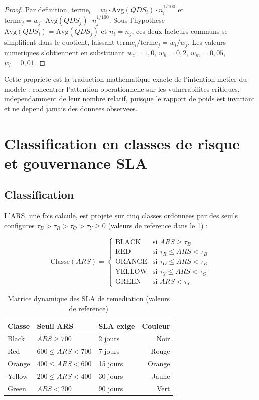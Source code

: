 \begin{proof}
Par definition, $\text{terme}_i = w_i\cdot\mathrm{Avg}(QDS_i)\cdot n_i^{1/100}$ et
$\text{terme}_j = w_j\cdot\mathrm{Avg}(QDS_j)\cdot n_j^{1/100}$. Sous l'hypothese
$\mathrm{Avg}(QDS_i)=\mathrm{Avg}(QDS_j)$ et $n_i=n_j$, ces deux facteurs communs se
simplifient dans le quotient, laissant $\text{terme}_i/\text{terme}_j = w_i/w_j$. Les
valeurs numeriques s'obtiennent en substituant $w_c=1{,}0$, $w_h=0{,}2$,
$w_m=0{,}05$, $w_l=0{,}01$.
\end{proof}

Cette propriete est la traduction mathematique exacte de l'intention metier du
modele : concentrer l'attention operationnelle sur les vulnerabilites critiques,
independamment de leur nombre relatif, puisque le rapport de poids est invariant et
ne depend jamais des donnees observees.

\section{Classification en classes de risque et gouvernance SLA}

\subsection{Classification}

L'ARS, une fois calcule, est projete sur cinq classes ordonnees par des seuils
configures $\tau_B>\tau_R>\tau_O>\tau_Y\ge0$ (valeurs de reference dans le
\cref{tab:sla}) :

\begin{equation}
\mathrm{Classe}(ARS) =
\begin{cases}
\text{BLACK} & \text{si } ARS \ge \tau_B \\
\text{RED} & \text{si } \tau_R \le ARS < \tau_B \\
\text{ORANGE} & \text{si } \tau_O \le ARS < \tau_R \\
\text{YELLOW} & \text{si } \tau_Y \le ARS < \tau_O \\
\text{GREEN} & \text{si } ARS < \tau_Y
\end{cases}
\label{eq:classify}
\end{equation}

\begin{table}[H]
\centering
\caption{Matrice dynamique des SLA de remediation (valeurs de reference)}
\label{tab:sla}
\begin{tabular}{@{}lllr@{}}
\toprule
\textbf{Classe} & \textbf{Seuil ARS} & \textbf{SLA exige} & \textbf{Couleur} \\
\midrule
Black  & $ARS \ge 700$          & 2 jours  & Noir \\
Red    & $600 \le ARS < 700$    & 7 jours  & Rouge \\
Orange & $400 \le ARS < 600$    & 15 jours & Orange \\
Yellow & $200 \le ARS < 400$    & 30 jours & Jaune \\
Green  & $ARS < 200$            & 90 jours & Vert \\
\bottomrule
\end{tabular}
\end{table}

